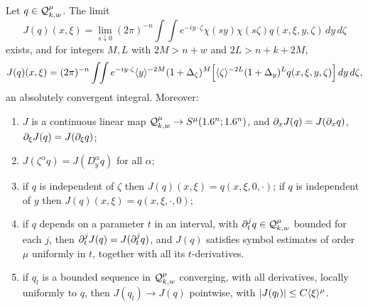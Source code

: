 \begin{lemma}\label{semiclassical:lem:J}
  Let $q\in\mathcal{Q}^{\mu}_{k,w}$. The limit
  \begin{equation*}
    J(q)(x,\xi)=\lim_{s\downarrow0}(2\pi)^{-n}\int\!\!\int e^{-iy\cdot\zeta}\chi(sy)\chi(s\zeta)q(x,\xi,y,\zeta)\,dy\,d\zeta
  \end{equation*}
  exists, and for integers $M,L$ with $2M>n+w$ and $2L>n+k+2M$,
  \begin{equation}\label{semiclassical:eq:J-formula}
    J(q)(x,\xi)=(2\pi)^{-n}\int\!\!\int e^{-iy\cdot\zeta}\langle y\rangle^{-2M}(1+\Delta_\zeta)^M
    \Bigl[\langle \zeta\rangle^{-2L}(1+\Delta_y)^Lq(x,\xi,y,\zeta)\Bigr]\,dy\,d\zeta,
  \end{equation}
  an absolutely convergent integral. Moreover:
  \begin{enumerate}[label=\textup{(\roman*)}]
  \item $J$ is a continuous linear map $\mathcal{Q}^{\mu}_{k,w}\to S^\mu(1.6^n;1.6^n)$, and
    $\partial_xJ(q)=J(\partial_xq)$, $\partial_\xi J(q)=J(\partial_\xi q)$;
  \item $J(\zeta^\alpha q)=J(D^\alpha_yq)$ for all $\alpha$;
  \item if $q$ is independent of $\zeta$ then $J(q)(x,\xi)=q(x,\xi,0,\cdot)$; if
    $q$ is independent of $y$ then $J(q)(x,\xi)=q(x,\xi,\cdot,0)$;
  \item if $q$ depends on a parameter $t$ in an interval, with
    $\partial^j_tq\in\mathcal{Q}^{\mu}_{k,w}$ bounded for each $j$, then
    $\partial^j_tJ(q)=J(\partial^j_tq)$, and $J(q)$ satisfies symbol estimates of order
    $\mu$ uniformly in $t$, together with all its $t$-derivatives.
  \item if $q_l$ is a bounded sequence in $\mathcal{Q}^{\mu}_{k,w}$ converging, with all
    derivatives, locally uniformly to $q$, then $J(q_l)\to J(q)$ pointwise,
    with $\lvert J(q_l)\rvert\le C\langle \xi\rangle^\mu$.
  \end{enumerate}
\end{lemma}
